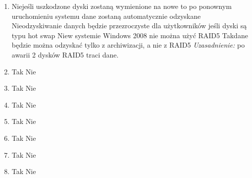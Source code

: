 \begin{enumerate}
		\item {}
		{Nie}{jeśli uszkodzone dyski zostaną wymienione na nowe to po ponownym uruchomieniu systemu dane zostaną automatycznie odzyskane}
		{Nie}{odzyskiwanie danych będzie przezroczyste dla użytkowników jeśli dyski są typu hot swap}
		{Nie}{w systemie Windows 2008 nie można użyć RAID5}
		{Tak}{dane będzie można odzyskać tylko z archiwizacji, a nie z RAID5}
		{\small \emph{Uzasadnienie:} po awarii 2 dysków RAID5 traci dane.}
		\item \question{}%
		{Tak}{}%
		{Nie}{}%
		{}{}%
		{}{}
		\item \question{}%
		{Tak}{}%
		{Nie}{}%
		{}{}%
		{}{}
		\item \question{}%
		{Tak}{}%
		{Nie}{}%
		{}{}%
		{}{}
		\item \question{}%
		{Tak}{}%
		{Nie}{}%
		{}{}%
		{}{}
		\item \question{}%
		{Tak}{}%
		{Nie}{}%
		{}{}%
		{}{}
		\item \question{}%
		{Tak}{}%
		{Nie}{}%
		{}{}%
		{}{}
		\item \question{}%
		{Tak}{}%
		{Nie}{}%
		{}{}%
		{}{}
		
		
		
	\end{enumerate}